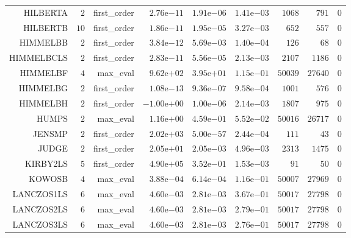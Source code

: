 \begin{longtable}{rrrrrrrrr}
HILBERTA & \(     2\) & first\_order & \( 2.76\)e\(-11\) & \( 1.91\)e\(-06\) & \( 1.41\)e\(-03\) & \(  1068\) & \(   791\) & \(     0\) \\
HILBERTB & \(    10\) & first\_order & \( 1.86\)e\(-11\) & \( 1.95\)e\(-05\) & \( 3.27\)e\(-03\) & \(   652\) & \(   557\) & \(     0\) \\
HIMMELBB & \(     2\) & first\_order & \( 3.84\)e\(-12\) & \( 5.69\)e\(-03\) & \( 1.40\)e\(-04\) & \(   126\) & \(    68\) & \(     0\) \\
HIMMELBCLS & \(     2\) & first\_order & \( 2.83\)e\(-11\) & \( 5.56\)e\(-05\) & \( 2.13\)e\(-03\) & \(  2107\) & \(  1186\) & \(     0\) \\
HIMMELBF & \(     4\) & max\_eval & \( 9.62\)e\(+02\) & \( 3.95\)e\(+01\) & \( 1.15\)e\(-01\) & \( 50039\) & \( 27640\) & \(     0\) \\
HIMMELBG & \(     2\) & first\_order & \( 1.08\)e\(-13\) & \( 9.36\)e\(-07\) & \( 9.58\)e\(-04\) & \(  1001\) & \(   576\) & \(     0\) \\
HIMMELBH & \(     2\) & first\_order & \(-1.00\)e\(+00\) & \( 1.00\)e\(-06\) & \( 2.14\)e\(-03\) & \(  1807\) & \(   975\) & \(     0\) \\
HUMPS & \(     2\) & max\_eval & \( 1.16\)e\(+00\) & \( 4.59\)e\(-01\) & \( 5.52\)e\(-02\) & \( 50016\) & \( 26717\) & \(     0\) \\
JENSMP & \(     2\) & first\_order & \( 2.02\)e\(+03\) & \( 5.00\)e\(-57\) & \( 2.44\)e\(-04\) & \(   111\) & \(    43\) & \(     0\) \\
JUDGE & \(     2\) & first\_order & \( 2.05\)e\(+01\) & \( 2.05\)e\(-03\) & \( 4.96\)e\(-03\) & \(  2313\) & \(  1475\) & \(     0\) \\
KIRBY2LS & \(     5\) & first\_order & \( 4.90\)e\(+05\) & \( 3.52\)e\(-01\) & \( 1.53\)e\(-03\) & \(    91\) & \(    50\) & \(     0\) \\
KOWOSB & \(     4\) & max\_eval & \( 3.88\)e\(-04\) & \( 6.14\)e\(-04\) & \( 1.16\)e\(-01\) & \( 50007\) & \( 27969\) & \(     0\) \\
LANCZOS1LS & \(     6\) & max\_eval & \( 4.60\)e\(-03\) & \( 2.81\)e\(-03\) & \( 3.67\)e\(-01\) & \( 50017\) & \( 27798\) & \(     0\) \\
LANCZOS2LS & \(     6\) & max\_eval & \( 4.60\)e\(-03\) & \( 2.81\)e\(-03\) & \( 2.79\)e\(-01\) & \( 50017\) & \( 27798\) & \(     0\) \\
LANCZOS3LS & \(     6\) & max\_eval & \( 4.60\)e\(-03\) & \( 2.81\)e\(-03\) & \( 2.76\)e\(-01\) & \( 50017\) & \( 27798\) & \(     0\) \\

\end{longtable}
